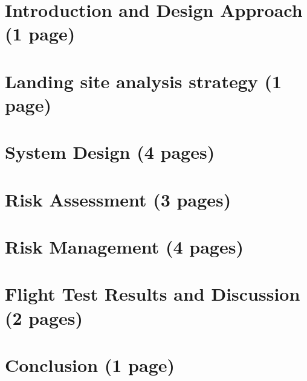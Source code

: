 \documentclass{article}
\begin{document}
\section{Introduction and Design Approach (1 page)}


\section{Landing site analysis strategy (1 page)}


\section{System Design (4 pages)}


\section{Risk Assessment (3 pages)}


\section{Risk Management (4 pages)}


\section{Flight Test Results and Discussion (2 pages)}


\section{Conclusion (1 page)}

\end{document}
